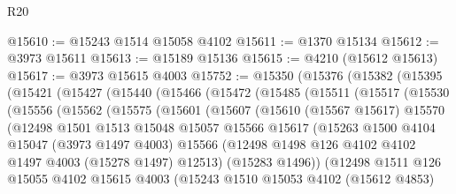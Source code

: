 \begin{lexlean}{R20}
\begin{coremodule}
@15610 := @15243 @1514 @15058 @4102
@15611 := @1370 @15134
@15612 := @3973 @15611
@15613 := @15189 @15136
@15615 := @4210 (@15612 @15613)
@15617 := @3973 @15615 @4003
@15752 := @15350
    (@15376
      (@15382
        (@15395
          (@15421
            (@15427
              (@15440
                (@15466
                  (@15472
                    (@15485
                      (@15511
                        (@15517
                          (@15530
                            (@15556
                              (@15562
                                (@15575
                                  (@15601
                                    (@15607
                                      (@15610
                                        (@15567 @15617)
                                        @15570
                                        (@12498
                                          @1501
                                          @1513
                                          @15048
                                          @15057
                                          @15566
                                          @15617
                                          (@15263
                                            @1500
                                            @4104
                                            @15047
                                            (@3973 @1497 @4003)
                                            @15566
                                            (@12498
                                              @1498
                                              @126
                                              @4102
                                              @4102
                                              @1497
                                              @4003
                                              (@15278 @1497)
                                              @12513)
                                            (@15283 @1496))
                                          (@12498
                                            @1511
                                            @126
                                            @15055
                                            @4102
                                            @15615
                                            @4003
                                            (@15243
                                              @1510
                                              @15053
                                              @4102
                                              (@15612 @4853)

\end{coremodule}
\end{lexlean}
